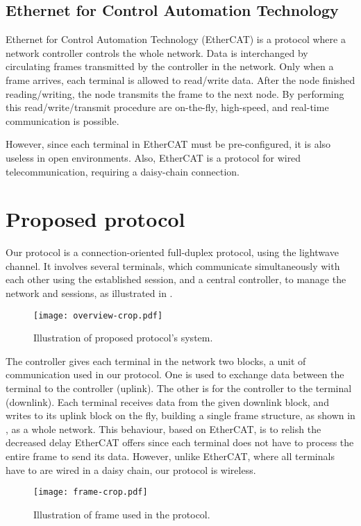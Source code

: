﻿\documentclass[twocolumn,9pt]{ltjsarticle}
\renewcommand{\ref}{\Cref}
\begin{document}
\subsection{Ethernet for Control Automation Technology}
Ethernet for Control Automation Technology (EtherCAT) is a protocol where a network controller controls the whole network.
Data is interchanged by circulating frames transmitted by the controller in the network.
Only when a frame arrives, each terminal is allowed to read/write data.
After the node finished reading/writing, the node transmits the frame to the next node.
By performing this read/write/transmit procedure are on-the-fly, high-speed, and real-time communication is possible.

However, since each terminal in EtherCAT must be pre-configured, it is also useless in open environments.
Also, EtherCAT is a protocol for wired telecommunication, requiring a daisy-chain connection.

\section{Proposed protocol}
Our protocol is a connection-oriented full-duplex protocol, using the lightwave channel.
It involves several terminals, which communicate simultaneously with each other using the established session, and a central controller, to manage the network and sessions, as illustrated in \ref{fig:overview}.

\begin{figure}[tb]
  \centering
  \texttt{[image: overview-crop.pdf]}
  \caption{\label{fig:overview}
    Illustration of proposed protocol's system.
  }
\end{figure}

The controller gives each terminal in the network two blocks, a unit of communication used in our protocol.
One is used to exchange data between the terminal to the controller (uplink).
The other is for the controller to the terminal (downlink).
Each terminal receives data from the given downlink block, and writes to its uplink block on the fly, building a single frame structure, as shown in \ref{fig:frame}, as a whole network.
This behaviour, based on EtherCAT, is to relish the decreased delay EtherCAT offers since each terminal does not have to process the entire frame to send its data.
However, unlike EtherCAT, where all terminals have to are wired in a daisy chain, our protocol is wireless.
\begin{figure}[tb]
  \centering
  \texttt{[image: frame-crop.pdf]}
  \caption{\label{fig:frame}
    Illustration of frame used in the protocol.
  }
\end{figure}
\end{document}
